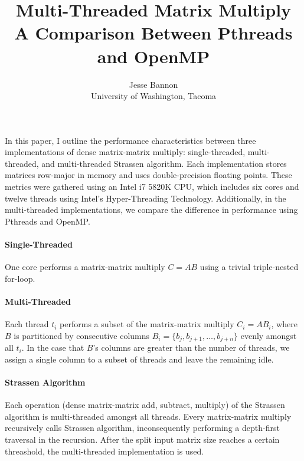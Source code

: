 \documentclass{article}
\begin{document}
\title{Multi-Threaded Matrix Multiply \\ \large A Comparison Between Pthreads and OpenMP}
\author{Jesse Bannon\\
University of Washington, Tacoma}
\renewcommand{\today}{July 10, 2017}
\maketitle

In this paper, I outline the performance characteristics between three implementations of dense matrix-matrix multiply: single-threaded, multi-threaded, and multi-threaded Strassen algorithm. Each implementation stores matrices row-major in memory and uses double-precision floating points. These metrics were gathered using an Intel i7 5820K CPU, which includes six cores and twelve threads using Intel's Hyper-Threading Technology. Additionally, in the multi-threaded implementations, we compare the difference in performance using Pthreads and OpenMP.

\paragraph{Single-Threaded}
One core performs a matrix-matrix multiply $C = AB$ using a trivial triple-nested for-loop.

\paragraph{Multi-Threaded}
Each thread $t_{i}$ performs a subset of the matrix-matrix multiply $C_{i} = AB_{i}$, where $B$ is partitioned by consecutive columns $B_{i} = \lbrace b_{j}, b_{j+1}, \dots, b_{j+n} \rbrace$ evenly amongst all $t_{i}$. In the case that $B$'s columns are greater than the number of threads, we assign a single column to a subset of threads and leave the remaining idle.

\paragraph{Strassen Algorithm}
Each operation (dense matrix-matrix add, subtract, multiply) of the Strassen algorithm is multi-threaded amongst all threads. Every matrix-matrix multiply recursively calls Strassen algorithm, inconsequently performing a depth-first traversal in the recursion. After the split input matrix size reaches a certain threashold, the multi-threaded implementation is used. \\
\end{document}
